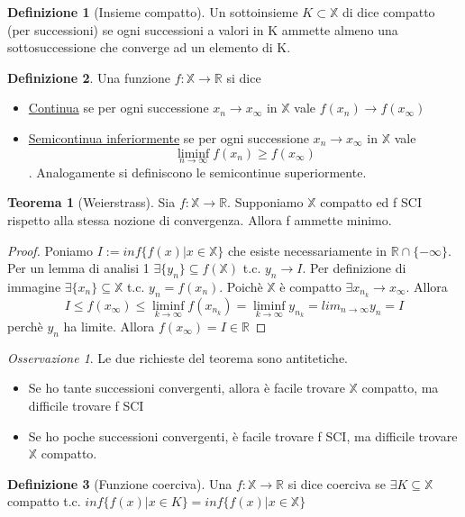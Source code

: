 \documentclass[a4paper]{book}
\theoremstyle{definition}
\newtheorem{defn}{Definizione}
\theoremstyle{remark}
\newtheorem{oss}{Osservazione}
\theoremstyle{definition}
\newtheorem{teo}{Teorema}
\newcommand{\bbx}{\mathbb{X}}
\newcommand{\bbr}{\mathbb{R}}
\begin{document}
\begin{defn}[Insieme compatto]
	Un sottoinsieme $K\subset\bbx$ di dice compatto (per successioni) se ogni successioni a valori in K ammette almeno una sottosuccessione che converge ad un elemento di K.
\end{defn}

\begin{defn}
	Una funzione $f:\bbx\to\bbr$ si dice
	\begin{itemize}
		\item \underline{Continua} se per ogni successione $x_n\to x_\infty$ in $\bbx$ vale $f(x_n)\to f(x_\infty)$
		\item \underline{Semicontinua inferiormente} se per ogni successione $x_n \to x_\infty$ in $\bbx$ vale $$\liminf_{n\to\infty} f(x_n)\ge f(x_\infty)$$. Analogamente si definiscono le semicontinue superiormente.
	\end{itemize}
\end{defn}

\begin{teo}[Weierstrass]
	Sia $f:\bbx\to\bbr$. Supponiamo $\bbx$ compatto ed f SCI rispetto alla stessa nozione di convergenza. Allora f ammette minimo.
\end{teo}

\begin{proof}
	Poniamo $I := inf\{f(x)|x\in \bbx\}$ che esiste necessariamente in $\bbr \cap \{-\infty\}$. Per un lemma di analisi 1 $\exists\{y_n\}\subseteq f(\bbx)$ t.c. $y_n \to I$. Per definizione di immagine $\exists \{x_n\}\subseteq \bbx$ t.c. $y_n = f(x_n)$. Poichè $\bbx$ è compatto $\exists x_{n_k} \to x_\infty$. Allora $$I\le f(x_\infty)\le \liminf_{k\to\infty} f(x_{n_k}) = \liminf_{k\to\infty} y_{n_k} = lim_{n\to\infty} y_n = I$$ perchè $y_n$ ha limite. Allora $f(x_\infty) = I \in \bbr$ \qedhere
\end{proof}

\begin{oss}
	Le due richieste del teorema sono antitetiche.
	\begin{itemize}
		\item Se ho tante successioni convergenti, allora è facile trovare $\bbx$ compatto, ma difficile trovare f SCI
		\item Se ho poche successioni convergenti, è facile trovare f SCI, ma difficile trovare $\bbx$ compatto.
	\end{itemize}
\end{oss}

\begin{defn}[Funzione coerciva]
	Una $f:\bbx\to\bbr$ si dice coerciva se $\exists K\subseteq \bbx$ compatto t.c. $inf\{f(x)|x\in K\} = inf\{f(x)| x \in \bbx\}$
\end{defn}
\end{document}
